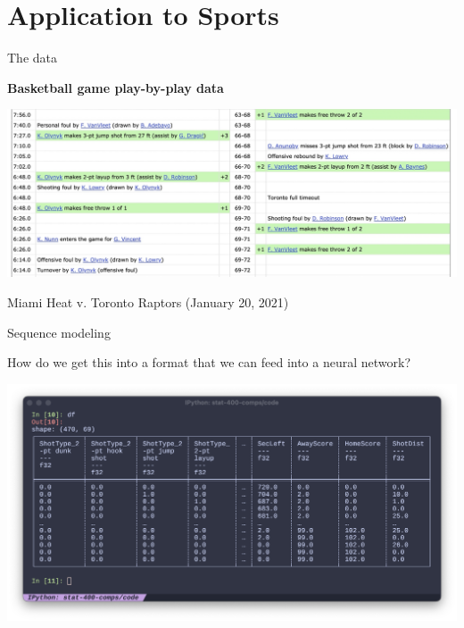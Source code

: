 \section{Application to Sports}

\begin{frame}{The data}

	\textbf{Basketball game play-by-play data}

	\medskip

	\includegraphics[width = \textwidth]{bbref-play-by-play.jpg}

	\medskip

	Miami Heat v. Toronto Raptors (January 20, 2021)
\end{frame}

\begin{frame}{Sequence modeling}

	How do we get this into a format that we can feed into a neural network?

	\pause

	\begin{center}
		\includegraphics[width = \textwidth]{play-by-play-encoding.png}
	\end{center}

\end{frame}


